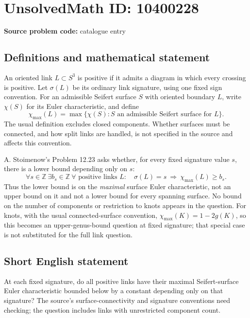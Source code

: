 \documentclass[11pt]{article}
\newcommand{\Z}{\mathbb{Z}}
\begin{document}
\section*{UnsolvedMath ID: 10400228}
\textbf{Source problem code:} catalogue entry
\subsection{Definitions and mathematical statement}
An oriented link \(L\subset S^3\) is positive if it admits a diagram in which every crossing is positive. Let \(\sigma(L)\) be its ordinary link signature, using one fixed sign convention. For an admissible Seifert surface \(S\) with oriented boundary \(L\), write \(\chi(S)\) for its Euler characteristic, and define
\[
 \chi_{\max}(L)=\max\{\chi(S):S\text{ an admissible Seifert surface for }L\}.
\]
The usual definition excludes closed components. Whether surfaces must be connected, and how split links are handled, is not specified in the source and affects this convention.

A. Stoimenow's Problem 12.23 asks whether, for every fixed signature value \(s\), there is a lower bound depending only on \(s\):
\[
 \forall s\in\Z\ \exists b_s\in\Z\ \forall\text{ positive links }L:\quad
 \sigma(L)=s\ \Longrightarrow\ \chi_{\max}(L)\ge b_s.
\]
Thus the lower bound is on the \emph{maximal} surface Euler characteristic, not an upper bound on it and not a lower bound for every spanning surface. No bound on the number of components or restriction to knots appears in the question. For knots, with the usual connected-surface convention, \(\chi_{\max}(K)=1-2g(K)\), so this becomes an upper-genus-bound question at fixed signature; that special case is not substituted for the full link question.
\subsection{Short English statement}
At each fixed signature, do all positive links have their maximal Seifert-surface Euler characteristic bounded below by a constant depending only on that signature? The source's surface-connectivity and signature conventions need checking; the question includes links with unrestricted component count.
\end{document}
